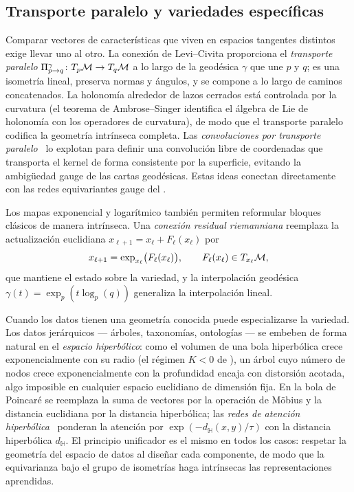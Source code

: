 \subsection{Transporte paralelo y variedades espec\'ificas}
\label{subsec:geo:specific}

Comparar vectores de caracter\'isticas que viven en espacios tangentes distintos
exige llevar uno al otro. La conexi\'on de Levi--Civita proporciona el
\emph{transporte paralelo} $\Pi_{p \to q}^\gamma \colon T_p\mathcal{M} \to T_q\mathcal{M}$ a lo
largo de la geod\'esica $\gamma$ que une $p$ y $q$; es una isometr\'ia lineal,
preserva normas y \'angulos, y se compone a lo largo de caminos concatenados. La
holonom\'ia alrededor de lazos cerrados est\'a controlada por la curvatura (el
teorema de Ambrose--Singer identifica el \'algebra de Lie de holonom\'ia con los
operadores de curvatura), de modo que el transporte paralelo codifica la
geometr\'ia intr\'inseca completa. Las \emph{convoluciones por transporte
paralelo}~\citep{schonsheck2018parallel} lo explotan para definir una
convoluci\'on libre de coordenadas que transporta el kernel de forma consistente
por la superficie, evitando la ambig\"uedad gauge de las cartas geod\'esicas.
Estas ideas conectan directamente con las redes equivariantes gauge del
.

Los mapas exponencial y logar\'itmico tambi\'en permiten reformular bloques
cl\'asicos de manera intr\'inseca. Una \emph{conexi\'on residual riemanniana}
reemplaza la actualizaci\'on euclidiana $x_{\ell+1} = x_\ell + F_\ell(x_\ell)$
por
\[
  x_{\ell+1} = \exp_{x_\ell}\!\big(F_\ell(x_\ell)\big),
    \qquad F_\ell(x_\ell) \in T_{x_\ell}\mathcal{M},
\]
que mantiene el estado sobre la variedad, y la interpolaci\'on geod\'esica
$\gamma(t) = \exp_p(t \log_p(q))$ generaliza la interpolaci\'on lineal.

Cuando los datos tienen una geometr\'ia conocida puede especializarse la
variedad. Los datos jer\'arquicos --- \'arboles, taxonom\'ias, ontolog\'ias ---
se embeben de forma natural en el \emph{espacio hiperb\'olico}: como el volumen
de una bola hiperb\'olica crece exponencialmente con su radio (el r\'egimen
$K < 0$ de ), un \'arbol cuyo n\'umero de nodos crece
exponencialmente con la profundidad encaja con distorsi\'on acotada, algo
imposible en cualquier espacio euclidiano de dimensi\'on fija. En la bola de
Poincar\'e se reemplaza la suma de vectores por la operaci\'on de M\"obius y la
distancia euclidiana por la distancia hiperb\'olica; las \emph{redes de
atenci\'on hiperb\'olica}~\citep{gulcehre2019hyperbolic} ponderan la atenci\'on
por $\exp(-d_{\mathbb{H}}(x,y)/\tau)$ con la distancia hiperb\'olica
$d_{\mathbb{H}}$. El principio unificador es el mismo en todos los casos:
respetar la geometr\'ia del espacio de datos al dise\~nar cada componente, de
modo que la equivarianza bajo el grupo de isometr\'ias haga intr\'insecas las
representaciones aprendidas.

